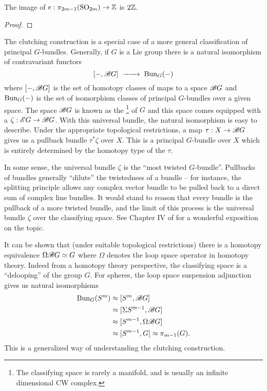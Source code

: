 \begin{corollary}
	The image of $e : \pi_{2m-1}({\operatorname{SO}}_{2m})\to\mathbb{Z}$ is $2\mathbb{Z}$.
\end{corollary}
\begin{proof}
\end{proof}

\begin{remark}
	The clutching construction is a special case of a more general classification of principal $G$-bundles. Generally, if $G$ is a Lie group there is a natural isomorphism of contravariant functors
	\[
		[-, \Bclass G] \lkxto \Bun_G(-)
	\]
	where $[-, \mathscr{B} G]$ is the set of homotopy classes of maps to a space $\mathscr{B} G$ and $\operatorname{Bun}_G(-)$ is the set of isomorphism classes of principal $G$-bundles over a given space.
	The space $\mathscr{B} G$ is known as the \footnote{The classifying space is rarely a manifold, and is usually an infinite dimensional CW complex.} of $G$ and this space comes equipped with a  $\zeta : \mathscr{E} G \to \mathscr{B} G$. With this universal bundle, the natural isomorphism is easy to describe. Under the appropriate topological restrictions, a map $\tau : X \to \mathscr{B} G$ gives us a pullback bundle $\tau^*\zeta$ over $X$. This is a principal $G$-bundle over $X$ which is entirely determined by the homotopy type of the  $\tau$.

	In some sense, the universal bundle $\zeta$ is the ``most twisted $G$-bundle''. Pullbacks of bundles generally ``dilute'' the twistedness of a bundle -- for instance, the splitting principle allows any complex vector bundle to be pulled back to a direct sum of complex line bundles. It would stand to reason that every bundle is the pullback of a more twisted bundle, and the limit of this process is the universal bundle $\zeta$ over the classifying space. See Chapter IV of \cite{botttu1982differential} for a wonderful exposition on the topic.

	It can be shown that (under suitable topological restrictions) there is a homotopy equivalence $\Omega \mathscr{B} G \simeq G$ where $\Omega$ denotes the loop space operator in homotopy theory. Indeed from a homotopy theory perspective, the classifying space is a ``delooping'' of the group $G$. For spheres, the loop space suspension adjunction gives us natural isomorphisms
	\[
		\begin{aligned}
			\operatorname{Bun}_{G}(S^m) & \approx [S^m, \mathscr{B} G]            \\
			              & \approx [\Sigma S^{m-1}, \mathscr{B} G] \\
			              & \approx [S^{m-1}, \Omega\mathscr{B} G]  \\
			              & \approx [S^{m-1}, G]
			\approx \pi_{m-1}(G).
		\end{aligned}
	\]
	This is a generalized way of understanding the clutching construction.
\end{remark}

